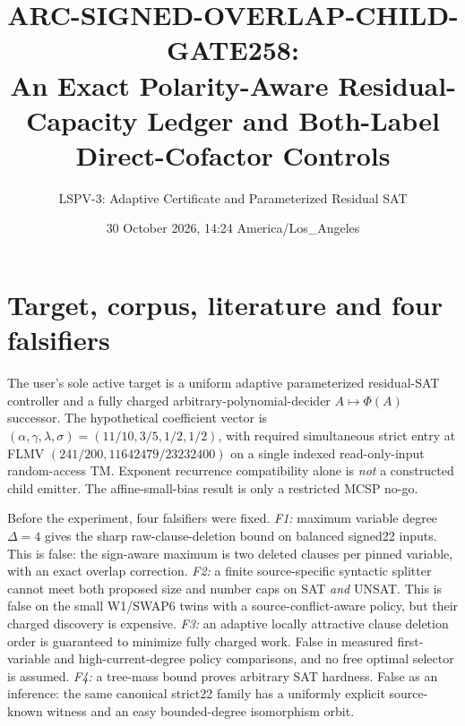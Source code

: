 \documentclass[10pt]{article}
\title{ARC-SIGNED-OVERLAP-CHILD-GATE258:\\An Exact Polarity-Aware Residual-Capacity Ledger and Both-Label Direct-Cofactor Controls}
\author{LSPV-3: Adaptive Certificate and Parameterized Residual SAT}
\date{30 October 2026, 14:24 America/Los\_Angeles}
\begin{document}
\maketitle
\noindent{}

\section{Target, corpus, literature and four falsifiers}
The user's sole active target is a uniform adaptive parameterized residual-SAT controller and a fully charged arbitrary-polynomial-decider $A\mapsto\Phi(A)$ successor. The hypothetical coefficient vector is $(\alpha,\gamma,\lambda,\sigma)=(11/10,3/5,1/2,1/2)$, with required simultaneous strict entry at FLMV $(241/200,11642479/23232400)$ on a single indexed read-only-input random-access TM. Exponent recurrence compatibility alone is \emph{not} a constructed child emitter. The affine-small-bias result is only a restricted MCSP no-go.

Before the experiment, four falsifiers were fixed. \emph{F1:} maximum variable degree $\Delta=4$ gives the sharp raw-clause-deletion bound on balanced signed22 inputs. This is false: the sign-aware maximum is two deleted clauses per pinned variable, with an exact overlap correction. \emph{F2:} a finite source-specific syntactic splitter cannot meet both proposed size and number caps on SAT \emph{and} UNSAT. This is false on the small W1/SWAP6 twins with a source-conflict-aware policy, but their charged discovery is expensive. \emph{F3:} an adaptive locally attractive clause deletion order is guaranteed to minimize fully charged work. False in measured first-variable and high-current-degree policy comparisons, and no free optimal selector is assumed. \emph{F4:} a tree-mass bound proves arbitrary SAT hardness. False as an inference: the same canonical strict22 family has a uniformly explicit source-known witness and an easy bounded-degree isomorphism orbit.
\end{document}
